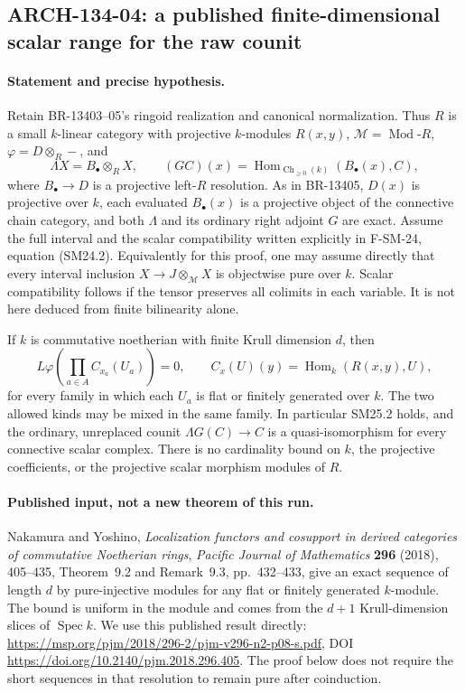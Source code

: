 \subsection{ARCH-134-04: a published finite-dimensional scalar range for the raw counit}

\paragraph{Statement and precise hypothesis.}
Retain BR-13403--05's ringoid realization and canonical normalization.
Thus $R$ is a small $k$-linear category with projective $k$-modules
$R(x,y)$, $\mathcal M=\operatorname{Mod}\!\text{-}R$,
$\varphi=D\otimes_R-$, and
\[
 \Lambda X=B_\bullet\otimes_R X,\qquad
 (GC)(x)=\operatorname{Hom}_{\operatorname{Ch}_{\ge0}(k)}(B_\bullet(x),C),
\]
where $B_\bullet\to D$ is a projective left-$R$ resolution.
As in BR-13405, $D(x)$ is projective over $k$, each evaluated
$B_\bullet(x)$ is a projective object of the connective chain category,
and both $\Lambda$ and its ordinary right adjoint $G$ are exact.
Assume the full interval and the scalar compatibility written explicitly
in F-SM-24, equation (SM24.2).  Equivalently for this proof, one may
assume directly that every interval inclusion
$X\to J\otimes_{\mathcal M}X$ is objectwise pure over $k$.
Scalar compatibility follows if the tensor preserves all colimits in
each variable.  It is not here deduced from finite bilinearity alone.

If $k$ is commutative noetherian with finite Krull dimension $d$, then
\[
 L\varphi\!\left(\prod_{a\in A}C_{x_a}(U_a)\right)=0,
 \qquad C_x(U)(y)=\operatorname{Hom}_k(R(x,y),U),
 \tag{ARCH134.14}
\]
for every family in which each $U_a$ is flat or finitely generated
over $k$.  The two allowed kinds may be mixed in the same family.
In particular SM25.2 holds, and the ordinary, unreplaced counit
$\Lambda G(C)\to C$ is a quasi-isomorphism for every connective
scalar complex.  There is no cardinality bound on $k$, the projective
coefficients, or the projective scalar morphism modules of $R$.

\paragraph{Published input, not a new theorem of this run.}
Nakamura and Yoshino, \emph{Localization functors and cosupport in
derived categories of commutative Noetherian rings},
\emph{Pacific Journal of Mathematics} \textbf{296} (2018), 405--435,
Theorem~9.2 and Remark~9.3, pp.~432--433, give an exact sequence of
length $d$ by pure-injective modules for any flat or finitely generated
$k$-module.  The bound is uniform in the module and comes from the
$d+1$ Krull-dimension slices of $\operatorname{Spec}k$.
We use this published result directly:
\url{https://msp.org/pjm/2018/296-2/pjm-v296-n2-p08-s.pdf},
DOI \url{https://doi.org/10.2140/pjm.2018.296.405}.
The proof below does not require the short sequences in that
resolution to remain pure after coinduction.

